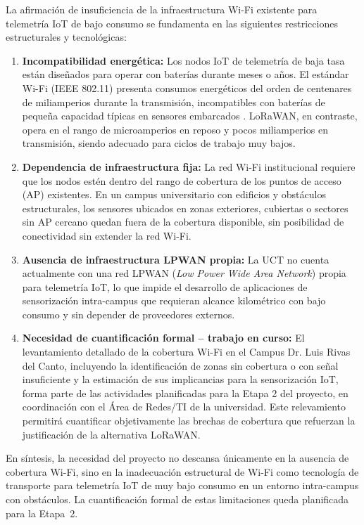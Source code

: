 \documentclass[12pt,oneside,openany,spanish,oldfontcommands]{memoir}
\begin{document}
La afirmación de insuficiencia de la infraestructura Wi-Fi existente para telemetría IoT
de bajo consumo se fundamenta en las siguientes restricciones estructurales y tecnológicas:

\begin{enumerate}
  \item \textbf{Incompatibilidad energética:} Los nodos IoT de telemetría de baja tasa
  están diseñados para operar con baterías durante meses o años. El estándar Wi-Fi
  (IEEE 802.11) presenta consumos energéticos del orden de centenares de miliamperios
  durante la transmisión, incompatibles con baterías de pequeña capacidad típicas en
  sensores embarcados \parencite{callebaut2020}. LoRaWAN, en contraste, opera en el rango
  de microamperios en reposo y pocos miliamperios en transmisión, siendo adecuado para
  ciclos de trabajo muy bajos.

  \item \textbf{Dependencia de infraestructura fija:} La red Wi-Fi institucional requiere
  que los nodos estén dentro del rango de cobertura de los puntos de acceso (AP) existentes.
  En un campus universitario con edificios y obstáculos estructurales, los sensores ubicados
  en zonas exteriores, cubiertas o sectores sin AP cercano quedan fuera de la cobertura
  disponible, sin posibilidad de conectividad sin extender la red Wi-Fi.

  \item \textbf{Ausencia de infraestructura LPWAN propia:} La UCT no cuenta actualmente
  con una red LPWAN (\textit{Low Power Wide Area Network}) propia para telemetría IoT,
  lo que impide el desarrollo de aplicaciones de sensorización intra-campus que requieran
  alcance kilométrico con bajo consumo y sin depender de proveedores externos.

  \item \textbf{Necesidad de cuantificación formal -- trabajo en curso:} El levantamiento
  detallado de la cobertura Wi-Fi en el Campus Dr. Luis Rivas del Canto, incluyendo la
  identificación de zonas sin cobertura o con señal insuficiente y la estimación de sus
  implicancias para la sensorización IoT, forma parte de las actividades planificadas para
  la Etapa 2 del proyecto, en coordinación con el Área de Redes/TI de la universidad. Este
  relevamiento permitirá cuantificar objetivamente las brechas de cobertura que refuerzan
  la justificación de la alternativa LoRaWAN.
\end{enumerate}

En síntesis, la necesidad del proyecto no descansa únicamente en la ausencia de cobertura
Wi-Fi, sino en la inadecuación estructural de Wi-Fi como tecnología de transporte para
telemetría IoT de muy bajo consumo en un entorno intra-campus con obstáculos. La
cuantificación formal de estas limitaciones queda planificada para la Etapa~2.
\end{document}
